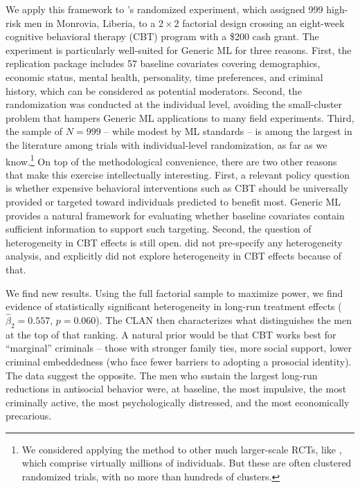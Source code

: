 \documentclass[11pt]{article}
\begin{document}
We apply this framework to \citet{blattman2017}'s randomized
experiment, which assigned 999 high-risk men in Monrovia, Liberia, to a
$2\times 2$ factorial design crossing an eight-week cognitive behavioral
therapy (CBT) program with a \$200 cash grant. The experiment is
particularly well-suited for Generic ML for three reasons. First, the replication package includes 57
baseline covariates covering demographics, economic status, mental health,
personality, time preferences, and criminal history, which can be considered as potential
moderators. Second, the randomization was conducted at the individual level,
avoiding the small-cluster problem that hampers Generic ML applications to
many field experiments. Third, the sample of $N = 999$ -- while
modest by ML standards -- is among the largest in the literature among trials with individual-level randomization, as far as we know.\footnote{We considered applying the method to other much larger-scale RCTs, like \cite{banerjee2023electronic}, which comprise virtually millions of individuals. But these are often clustered randomized trials, with no more than hundreds of clusters.}
On top of the methodological convenience, there are two other reasons that make this exercise intellectually interesting. First, a relevant policy question is whether expensive behavioral interventions such as CBT should be universally provided or targeted toward individuals predicted to benefit most. Generic ML provides a natural framework for evaluating whether baseline covariates contain sufficient information to support such targeting. Second, the question of heterogeneity in CBT effects is still open. \cite{blattman2017} did not pre-specify any heterogeneity analysis, and explicitly did not explore heterogeneity in CBT effects because of that.

We find new results. Using the full factorial sample to maximize power, we find evidence of statistically significant heterogeneity in long-run treatment effects ($\hat\beta_2 = 0.557$, $p = 0.060$). The CLAN then characterizes what distinguishes the men at the top of that ranking. A natural prior would be that CBT works best for ``marginal'' criminals -- those with stronger family ties, more social support, lower criminal embeddedness (who face fewer barriers to adopting a prosocial identity). The data suggest the opposite. The men who sustain the largest long-run reductions in antisocial behavior were, at baseline, the most impulsive, the most criminally active, the most psychologically distressed, and the most economically precarious. %
\end{document}
